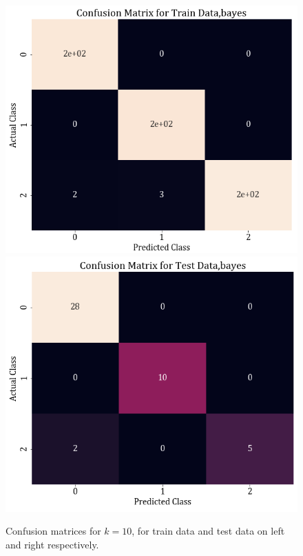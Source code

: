 \documentclass[11pt,a4paper]{article}
\begin{document}
\begin{figure}[H]
    \includegraphics[scale=0.4]{images/1b_conf_mat_nb_train.png}
    \includegraphics[scale=0.4]{images/1b_conf_mat_nb_test.png}
    \caption{Confusion matrices for $k=10$, for train data and test data on left and right respectively.}
    \label{fig:1b_cm_nb}
\end{figure}
\end{document}
